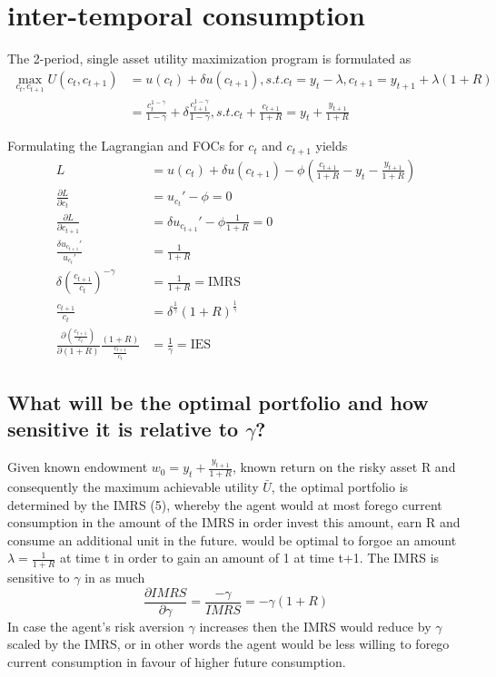 \documentclass[]{article}
\begin{document}
\section{inter-temporal consumption}
The 2-period, single asset utility maximization program is formulated as
\begin{align*}
	\max_{c_t, c_{t+1}} U(c_t, c_{t+1}) &= u(c_t) + \delta u(c_{t+1}), s.t. c_t = y_t - \lambda, c_{t+1} = y_{t+1} + \lambda (1+R)\\
	&= \frac{c_t^{1-\gamma}}{1-\gamma} + \delta \frac{c_{t+1}^{1-\gamma}}{1-\gamma}, s.t. c_t + \frac{c_{t+1}}{1+R} = y_t + \frac{y_{t+1}}{1+R}
\end{align*}

Formulating the Lagrangian and FOCs for $c_t$ and $c_{t+1}$ yields
\begin{align}
	L &= u(c_t) + \delta u(c_{t+1}) - \phi (\frac{c_{t+1}}{1+R} - y_t - \frac{y_{t+1}}{1+R})\\
	\frac{\partial L}{\partial c_t} &= u_{c_t}' - \phi = 0\\
	\frac{\partial L}{\partial c_{t+1}} &= \delta u_{c_{t+1}}' - \phi \frac{1}{1+R}= 0\\
	\frac{\delta u_{c_{t+1}}'}{u_{c_t}'} &= \frac{1}{1+R}\\
	\delta \left( \frac{c_{t+1}}{c_t} \right)^{-\gamma} &= \frac{1}{1+R} = \text{IMRS}\\
	\frac{c_{t+1}}{c_t} &= \delta^{\frac{1}{\gamma}}(1+R)^{\frac{1}{\gamma}}\\
	\frac{\partial(\frac{c_{t+1}}{c_t})}{\partial(1+R)} \frac{(1+R)}{\frac{c_{t+1}}{c_t}} &= \frac{1}{\gamma} = \text{IES}
\end{align}

\subsection{What will be the optimal portfolio and how sensitive it is relative to $\gamma$?}
Given known endowment $w_0 = y_t + \frac{y_{t+1}}{1+R}$, known return on the risky asset R and consequently the maximum achievable utility $\bar{U}$, the optimal portfolio is determined by the IMRS (5), whereby the agent would at most forego current consumption in the amount of the IMRS in order invest this amount, earn R and consume an additional unit in the future.  would be optimal to forgoe an amount $\lambda = \frac{1}{1+R}$ at time t in order to gain an amount of 1 at time t+1. The IMRS is sensitive to $\gamma$ in as much $$\frac{\partial IMRS}{\partial \gamma} = \frac{-\gamma}{IMRS} = -\gamma (1+R)$$ In case the agent's risk aversion $\gamma$ increases then the IMRS would reduce by $\gamma$ scaled by the IMRS, or in other words the agent would be less willing to forego current consumption in favour of higher future consumption.
\end{document}

